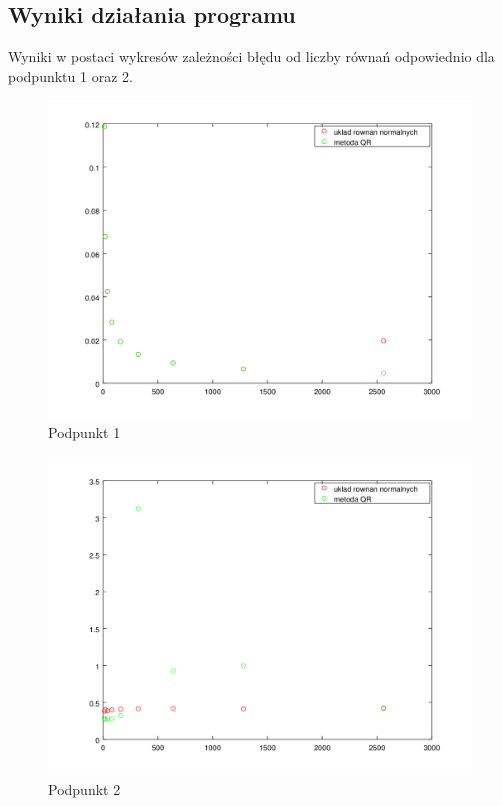 \documentclass[a4paper, 11pt]{article}
\begin{document}
\vspace{2cm}

\subsection{Wyniki działania programu}
Wyniki w postaci wykresów zależności błędu od liczby równań odpowiednio dla podpunktu 1 oraz 2. 

\begin{figure}[th]
\caption{Podpunkt 1}
\includegraphics[width=\textwidth]{figure1}
\end{figure}

\begin{figure}[th]
\caption{Podpunkt 2}
\includegraphics[width=\textwidth]{figure2}
\end{figure}
\end{document}
